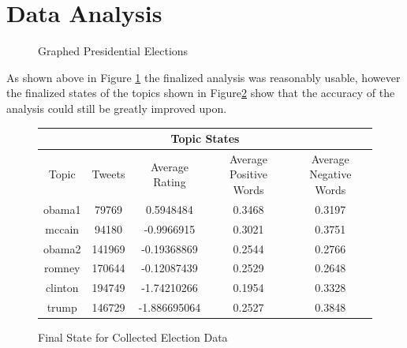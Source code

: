 \documentclass[12pt,a4paper]{report}
\begin{document}
  \section{Data Analysis}
  \begin{figure}[h]
    \centering
    \caption{Graphed Presidential Elections}
    \label{fig:ex}
  \end{figure}
  As shown above in Figure \ref{fig:ex} the finalized analysis was reasonably usable, however the finalized states of the topics shown in Figure\ref{t:1} show that the accuracy of the analysis could still be greatly improved upon.
  \begin{figure}[h]
    \centering
    \begin{tabular}{|c||c|c|c|c|}
      \hline
      \multicolumn{5}{|c|}{Topic States} \\
      \hline
      Topic & Tweets & Average Rating & Average Positive Words & Average Negative Words \\ [0.5ex]
      \hline
      \hline
      obama1 & 79769 & 0.5948484 & 0.3468 & 0.3197 \\
      \hline
      mccain & 94180 & -0.9966915 & 0.3021 & 0.3751 \\
      \hline
      obama2 & 141969 & -0.19368869 & 0.2544 & 0.2766 \\
      \hline
      romney & 170644 & -0.12087439 & 0.2529 & 0.2648 \\
      \hline
      clinton & 194749 & -1.74210266 & 0.1954 & 0.3328 \\
      \hline
      trump & 146729 & -1.886695064 & 0.2527 & 0.3848 \\
      \hline
    \end{tabular}
    \caption{Final State for Collected Election Data}
    \label{t:1}
  \end{figure}
\end{document}
